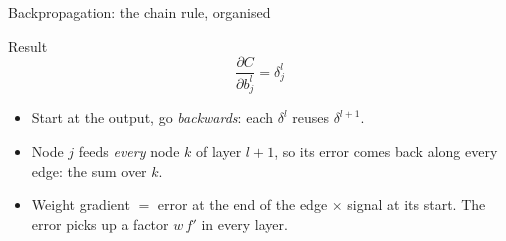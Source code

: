\documentclass[10pt,aspectratio=169]{beamer}
\begin{document}
\begin{frame}{Backpropagation: the chain rule, organised}
\begin{block}{Result}
\[  \frac{\partial C}{\partial b^{l}_{j}}=\delta^{l}_{j}
\]
\end{block}
\vspace{-4pt}
\footnotesize
\begin{itemize}
  \item Start at the output, go \emph{backwards}: each $\delta^{l}$ reuses
        $\delta^{l+1}$.
  \item Node $j$ feeds \emph{every} node $k$ of layer $l+1$, so its error
        comes back along every edge: the sum over $k$.
  \item Weight gradient $=$ error at the end of the edge $\times$ signal at
        its start.  The error picks up a factor $w\,f'$ in every layer.
\end{itemize}
\end{frame}
\end{document}
